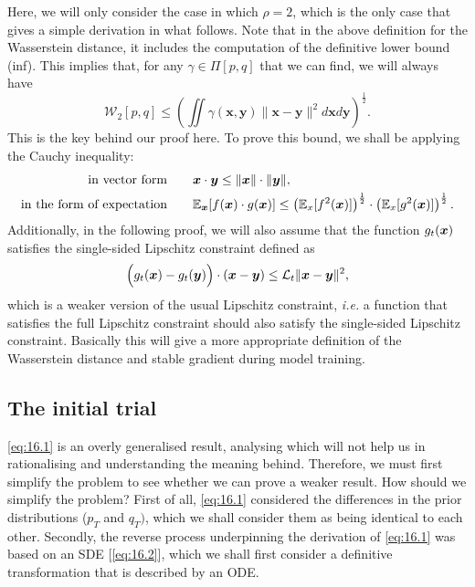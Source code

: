 Here, we will only  consider the case in which $\rho=2$, which is the only case that gives a simple derivation in what follows. Note that in the above definition for the Wasserstein distance, it includes the computation of the definitive lower bound (inf). This implies that, for any $\gamma\in\Pi[p,q]$ that we can find, we will always have
\begin{equation}
    \label{eq:16.8}
    \mathcal{W}_{2}[p,q]\leq \left( \iint\gamma(\bm{x},\bm{y})\|\bm{x}-\bm{y}\|^2 d\bm{x}d\bm{y}\right)^{\frac{1}{2}}.
\end{equation}
This is the key behind our proof here. To prove this bound, we shall be applying the Cauchy inequality:
\begin{align}
    \mbox{in vector form}\qquad &\bm{x}\cdot\bm{y}\leq \|\bm{x}\|\cdot \|\bm{y}\|, \nonumber \\
    \mbox{in the form of expectation}\qquad & \mathbb{E}_{\bm{x}}[f(\bm{x})\cdot g(\bm{x})]\leq \left(\mathbb{E}_{x}[f^2(\bm{x})]\right)^{\frac{1}{2}}\cdot\left(\mathbb{E}_{x}[g^2(\bm{x})]\right)^{\frac{1}{2}}. \label{eq:16.9}
\end{align}
Additionally, in the following proof, we will also assume that the function $g_t (\bm{x})$ satisfies the single-sided Lipschitz constraint defined as
\begin{equation}
    \label{eq:16.10}
    \Bigl(g_t(\bm{x})-g_t(\bm{y}) \Bigr)\cdot(\bm{x}-\bm{y})\leq \mathcal{L}_t\|\bm{x}-\bm{y}\|^2,
\end{equation}
which is a weaker version of the usual Lipschitz constraint, \emph{i.e.} a function that satisfies the full Lipschitz constraint should also satisfy the single-sided Lipschitz constraint. Basically this will give a more appropriate definition of the Wasserstein distance and stable gradient during model training.

\subsection{The initial trial}
\cref{eq:16.1} is an overly generalised result, analysing which will not help us in rationalising and understanding the meaning behind. Therefore, we must first simplify the problem to see whether we can prove a weaker result. How should we simplify the problem? First of all, \cref{eq:16.1} considered the differences in the prior distributions ($p_T$ and $q_T)$, which we shall consider them as being identical to each other. Secondly, the reverse process underpinning the derivation of \cref{eq:16.1} was based on an SDE [\cref{eq:16.2}], which we shall first consider a definitive transformation that is described by an ODE.

